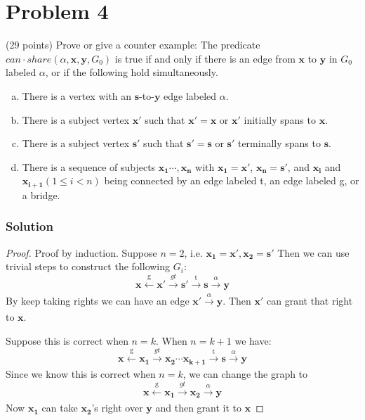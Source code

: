 \section*{Problem 4}
 (29 points) Prove or give a counter example:
The predicate $can\cdot share(\alpha, \mathbf{x}, \mathbf{y}, G_0)$ is true if and only if there is an edge from $\mathbf{x}$ to $\mathbf{y}$ in $G_0$ labeled $\alpha$, or if the following hold simultaneously.
\begin{enumerate}[(a)]
    \item There is a vertex with an $\mathbf{s}$-to-$\mathbf{y}$ edge labeled $\alpha$.
    \item There is a subject vertex $\mathbf{x'}$ such that $\mathbf{x'} = \mathbf{x}$ or $\mathbf{x'}$ initially spans to $\mathbf{x}$.
    \item There is a subject vertex $\mathbf{s'}$ such that $\mathbf{s'} = \mathbf{s}$ or $\mathbf{s'}$ terminally spans to $\mathbf{s}$.
    \item There is a sequence of subjects $\mathbf{x_1} \cdots, \mathbf{x_n}$ with $\mathbf{x_1} = \mathbf{x'}$, $\mathbf{x_n} = \mathbf{s'}$, and $\mathbf{x_i}$ and $\mathbf{x_{i+1}} (1 \le i < n)$ being connected by an edge labeled t, an edge labeled g, or a bridge.
\end{enumerate}

\subsubsection*{Solution}

\begin{proof}
    Proof by induction.
    Suppose $n = 2$, i.e. $\mathbf{x_1} = \mathbf{x'}, \mathbf{x_2} = \mathbf{s'}$
    Then we can use trivial steps to construct the following $G_i$:
    $$\mathbf{x} \xleftarrow[]{\text{g}} \mathbf{x'} \xrightarrow[]{gt} \mathbf{s'} \xrightarrow{\text{t}} \mathbf{s} \xrightarrow[]{\alpha} \mathbf{y}$$
    By keep taking rights we can have an edge $\mathbf{x'} \xrightarrow[]{\alpha} \mathbf{y}$.
    Then $\mathbf{x'}$ can grant that right to $\mathbf{x}$.

    Suppose this is correct when $n = k$. When $n = k + 1$ we have:
    $$\mathbf{x} \xleftarrow[]{\text{g}} \mathbf{x_1} \xrightarrow[]{gt} \mathbf{x_2}  \cdots \mathbf{x_{k+1}} \xrightarrow{\text{t}} \mathbf{s} \xrightarrow[]{\alpha} \mathbf{y}$$
    Since we know this is correct when $n=k$, we can change the graph to
    $$\mathbf{x} \xleftarrow[]{\text{g}} \mathbf{x_1} \xrightarrow[]{gt} \mathbf{x_2} \xrightarrow[]{\alpha} \mathbf{y}$$
    Now $\mathbf{x_1}$ can take $\mathbf{x_2}$'s right over $\mathbf{y}$ and then grant it to $\mathbf{x}$
\end{proof}